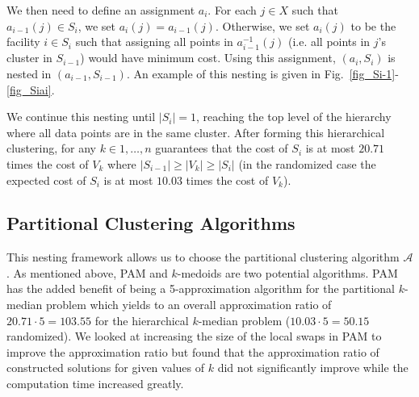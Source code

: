 \documentclass[conference, 10pt, final]{IEEEtran}
\begin{document}
We then need to define an assignment $a_i$. For each $j \in X$ such that $a_{i-1}(j) \in S_{i}$, we set $a_i(j) = a_{i-1}(j)$. Otherwise, we set $a_i(j)$ to be the facility $i \in S_i$ such that assigning all points in $a_{i-1}^{-1}(j)$ (i.e. all points in $j$'s cluster in $S_{i-1}$) would have minimum cost. Using this assignment, $(a_i, S_i)$ is nested in $(a_{i-1}, S_{i-1})$. An example of this nesting is given in Fig.~\ref{fig_Si-1}-\ref{fig_Siai}.

We continue this nesting until $|S_i| = 1$, reaching the top level of the hierarchy where all data points are in the same cluster. After forming this hierarchical clustering, for any $k \in 1, \ldots, n$ \cite{Lin} guarantees that the cost of $S_i$ is at most $20.71$ times the cost of $V_k$ where $|S_{i-1}| \geq |V_k| \geq |S_{i}|$ (in the randomized case the expected cost of $S_i$ is at most $10.03$ times the cost of $V_k$).


\subsection{Partitional Clustering Algorithms}
This nesting framework allows us to choose the partitional clustering algorithm $\mathcal{A}$. As mentioned above, PAM and $k$-medoids are two potential algorithms. PAM has the added benefit of being a 5-approximation algorithm for the partitional $k$-median problem which yields to an overall approximation ratio of $20.71 \cdot 5 = 103.55$ for the hierarchical $k$-median problem ($10.03 \cdot 5 = 50.15$ randomized). We looked at increasing the size of the local swaps in PAM to improve the approximation ratio but found that the approximation ratio of constructed solutions for given values of $k$ did not significantly improve while the computation time increased greatly. 
\end{document}
